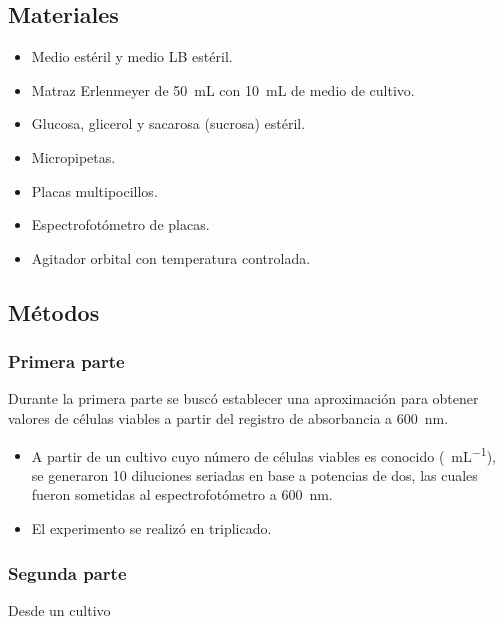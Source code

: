 \subsection{Materiales}

\begin{multicols}{2}
  \begin{itemize}
    \item Medio estéril y medio LB estéril.
    \item Matraz Erlenmeyer de \SI{50}{\mL} con \SI{10}{\mL} de medio de cultivo.
    \item Glucosa, glicerol y sacarosa (sucrosa) estéril. 
    \item Micropipetas. 
    \item Placas multipocillos. 
    \item Espectrofotómetro de placas. 
    \item Agitador orbital con temperatura controlada.
  \end{itemize}
\end{multicols}

\subsection{Métodos}

\subsubsection{Primera parte}

Durante la primera parte se buscó establecer una aproximación para obtener valores de células viables a partir del registro de absorbancia a \SI{600}{\nm}.
\begin{itemize}
  \item A partir de un cultivo cuyo número de células viables es conocido (\si{\UFC\per\mL}), se generaron 10 diluciones seriadas en base a potencias de dos, las cuales fueron sometidas al espectrofotómetro a \SI{600}{\nm}. 
  \item El experimento se realizó en triplicado.
\end{itemize}

\subsubsection{Segunda parte}

Desde un cultivo
